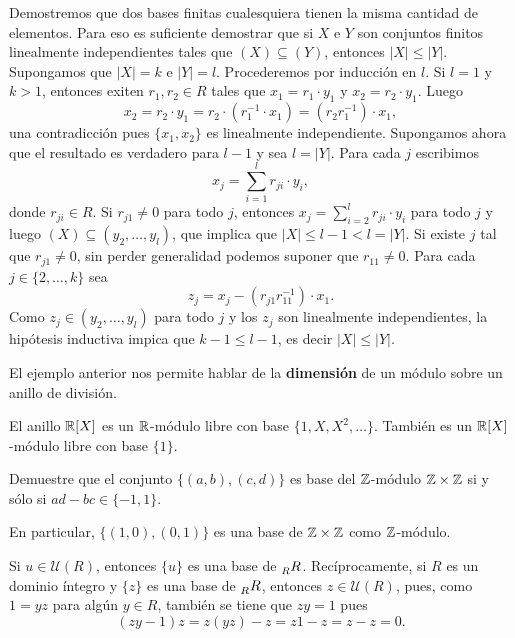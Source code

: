 \begin{example}
Demostremos que dos bases finitas cualesquiera tienen la misma cantidad de elementos. 
Para eso es suficiente demostrar
que si $X$ e $Y$ son conjuntos finitos linealmente independientes
tales que $(X)\subseteq (Y)$, entonces $|X|\leq |Y|$. Supongamos que $|X|=k$ e $|Y|=l$. 
Procederemos por inducción en $l$. Si $l=1$ y $k>1$, entonces
exiten $r_1,r_2\in R$ tales que $x_1=r_1\cdot y_1$ y $x_2=r_2\cdot y_1$. Luego
\[
x_2=r_2\cdot y_1=r_2\cdot (r_1^{-1}\cdot x_1)=(r_2r_1^{-1})\cdot x_1,
\]
una contradicción pues $\{x_1,x_2\}$ es linealmente independiente. 
Supongamos ahora que el resultado 
es verdadero para $l-1$ y sea $l=|Y|$. Para cada $j$ escribimos
\[
x_j = \sum_{i=1}^l r_{ji}\cdot y_i,
\]
donde $r_{ji}\in R$. Si $r_{j1}\ne 0$ para todo $j$, entonces 
$x_j=\sum_{i=2}^l r_{ji}\cdot y_i$ para todo $j$ y luego $(X)\subseteq (y_2,\dots,y_l)$, que implica que
$|X|\leq l-1<l=|Y|$. Si existe $j$ tal que $r_{j1}\ne 0$, sin perder generalidad podemos
suponer que $r_{11}\ne 0$. Para cada $j\in\{2,\dots,k\}$ sea
\[
z_j = x_j-(r_{j1}r_{11}^{-1})\cdot x_1.
\]
Como $z_j\in (y_2,\dots,y_l)$ para todo $j$ y los $z_j$ son linealmente independientes, 
la hipótesis inductiva impica que $k-1\leq l-1$, es decir $|X|\leq |Y|$.  
\end{example}

El ejemplo anterior nos permite hablar de 
la \textbf{dimensión} de un módulo sobre un anillo de división. 

\begin{example}
El anillo $\mathbb{R}[X]$ es un $\mathbb{R}$-módulo libre con base $\{1,X,X^2,\dots\}$. También es un $\mathbb{R}[X]$-módulo libre con base $\{1\}$.  	
\end{example}

\begin{exercise}
Demuestre que el conjunto $\{(a,b),(c,d)\}$ es base del $\mathbb{Z}$-módulo $\mathbb{Z}\times\mathbb{Z}$ si y sólo si $ad-bc\in\{-1,1\}$. 
\end{exercise}

En particular, $\{(1,0),(0,1)\}$ es una base de $\mathbb{Z}\times\mathbb{Z}$ como $\mathbb{Z}$-módulo. 

\begin{example}
Si $u\in\mathcal{U}(R)$, entonces $\{u\}$ es una base de $\prescript{}{R}R$. Recíprocamente, si $R$ es un dominio íntegro y  
$\{z\}$ es una base de $\prescript{}{R}R$, entonces $z\in\mathcal{U}(R)$, pues, como
$1=yz$ para algún $y\in R$, también se tiene que $zy=1$ pues  
\[
(zy-1)z=z(yz)-z=z1-z=z-z=0.
\]	
\end{example}

